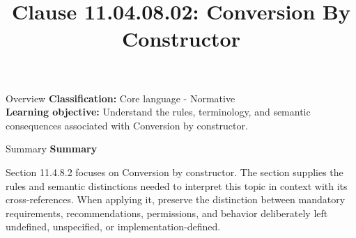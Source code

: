 \documentclass[10pt,letterpaper]{article}
\title{Clause 11.04.08.02: Conversion By Constructor}
\author{}
\date{}
\begin{document}
\maketitle
\begin{CornellOverviewBox}{Overview}
\textbf{Classification:} Core language - Normative\\[2pt]
\textbf{Learning objective:} Understand the rules, terminology, and semantic consequences associated with Conversion by constructor.
\end{CornellOverviewBox}\begin{CornellSummaryBox}{Summary}
{\sffamily\bfseries\color{Accent} Summary}\par\vspace{3pt}Section 11.4.8.2 focuses on Conversion by constructor. The section supplies the rules and semantic distinctions needed to interpret this topic in context with its cross-references. When applying it, preserve the distinction between mandatory requirements, recommendations, permissions, and behavior deliberately left undefined, unspecified, or implementation-defined.
\end{CornellSummaryBox}
\end{document}
